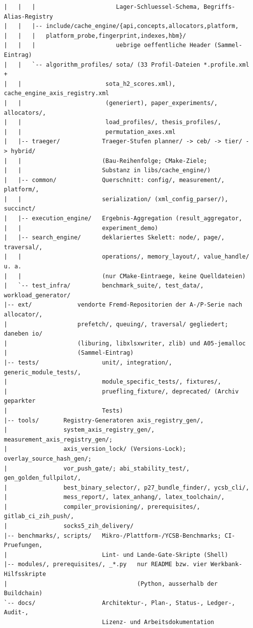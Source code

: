 {\begin{verbatim}
|   |   |                       Lager-Schluessel-Schema, Begriffs-Alias-Registry
|   |   |-- include/cache_engine/{api,concepts,allocators,platform,
|   |   |   platform_probe,fingerprint,indexes,hbm}/
|   |   |                       uebrige oeffentliche Header (Sammel-Eintrag)
|   |   `-- algorithm_profiles/ sota/ (33 Profil-Dateien *.profile.xml +
|   |                        sota_h2_scores.xml), cache_engine_axis_registry.xml
|   |                        (generiert), paper_experiments/, allocators/,
|   |                        load_profiles/, thesis_profiles/,
|   |                        permutation_axes.xml
|   |-- traeger/            Traeger-Stufen planner/ -> ceb/ -> tier/ -> hybrid/
|   |                       (Bau-Reihenfolge; CMake-Ziele;
|   |                       Substanz in libs/cache_engine/)
|   |-- common/             Querschnitt: config/, measurement/, platform/,
|   |                       serialization/ (xml_config_parser/), succinct/
|   |-- execution_engine/   Ergebnis-Aggregation (result_aggregator,
|   |                       experiment_demo)
|   |-- search_engine/      deklariertes Skelett: node/, page/, traversal/,
|   |                       operations/, memory_layout/, value_handle/ u. a.
|   |                       (nur CMake-Eintraege, keine Quelldateien)
|   `-- test_infra/         benchmark_suite/, test_data/, workload_generator/
|-- ext/             vendorte Fremd-Repositorien der A-/P-Serie nach allocator/,
|                    prefetch/, queuing/, traversal/ gegliedert; daneben io/
|                    (liburing, libxlsxwriter, zlib) und A05-jemalloc
|                    (Sammel-Eintrag)
|-- tests/                  unit/, integration/, generic_module_tests/,
|                           module_specific_tests/, fixtures/,
|                           pruefling_fixture/, deprecated/ (Archiv geparkter
|                           Tests)
|-- tools/       Registry-Generatoren axis_registry_gen/,
|                system_axis_registry_gen/, measurement_axis_registry_gen/;
|                axis_version_lock/ (Versions-Lock); overlay_source_hash_gen/;
|                vor_push_gate/; abi_stability_test/, gen_golden_fullpilot/,
|                best_binary_selector/, p27_bundle_finder/, ycsb_cli/,
|                mess_report/, latex_anhang/, latex_toolchain/,
|                compiler_provisioning/, prerequisites/, gitlab_ci_zih_push/,
|                socks5_zih_delivery/
|-- benchmarks/, scripts/   Mikro-/Plattform-/YCSB-Benchmarks; CI-Pruefungen,
|                           Lint- und Lande-Gate-Skripte (Shell)
|-- modules/, prerequisites/, _*.py   nur README bzw. vier Werkbank-Hilfsskripte
|                                     (Python, ausserhalb der Buildchain)
`-- docs/                   Architektur-, Plan-, Status-, Ledger-, Audit-,
                            Lizenz- und Arbeitsdokumentation
\end{verbatim}
}

